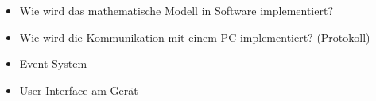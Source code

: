 \begin{itemize}
    \item
        Wie wird das mathematische Modell in Software implementiert?
    \item
        Wie wird die Kommunikation mit einem PC implementiert? (Protokoll)
    \item
        Event-System
    \item
        User-Interface am Ger\"at
\end{itemize}


